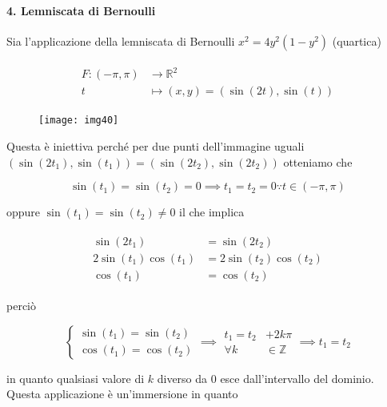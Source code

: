 \paragraph{4. Lemniscata di Bernoulli}

Sia l'applicazione della lemniscata di Bernoulli $ x^{2} = 4 y^{2} (1-y^{2}) $ (quartica)

\begin{align}
	\begin{split}
		F : (-\pi,\pi) &\to \mathbb{R}^{2}\\
		t &\mapsto (x,y) = (\sin(2t),\sin(t))
	\end{split}
\end{align}

\begin{figure}[H]
	\centering
	\texttt{[image: img40]}
\end{figure}

Questa è iniettiva perché per due punti dell'immagine uguali $ (\sin(2t_{1}),\sin(t_{1})) = (\sin(2t_{2}),\sin(2t_{2})) $ otteniamo che

\begin{equation}
	\sin(t_{1}) = \sin(t_{2}) = 0 \implies t_{1} = t_{2} = 0 \because t \in (-\pi,\pi)
\end{equation}

oppure $ \sin(t_{1}) = \sin(t_{2}) \neq 0 $ il che implica

\begin{align}
	\begin{split}
		\sin(2t_{1}) &= \sin(2t_{2})\\
		2 \sin(t_{1}) \cos(t_{1}) &= 2 \sin(t_{2}) \cos(t_{2})\\
		\cos(t_{1}) &= \cos(t_{2})
	\end{split}		
\end{align}

perciò

\begin{equation}
	\begin{cases}
		\sin(t_{1}) = \sin(t_{2})\\
		\cos(t_{1}) = \cos(t_{2})
	\end{cases}%
	\implies%
	\begin{aligned}
		t_{1} = t_{2} &+ 2 k \pi\\
		\forall k &\in \mathbb{Z}
	\end{aligned}
	\implies%
	t_{1} = t_{2}
\end{equation}

in quanto qualsiasi valore di $ k $ diverso da 0 esce dall'intervallo del dominio.\\
Questa applicazione è un'immersione in quanto

